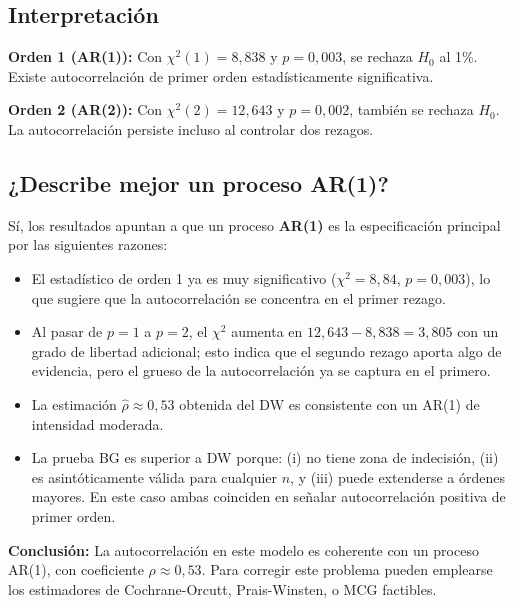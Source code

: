 \documentclass[12pt,a4paper]{article}
\begin{document}
\subsection{Interpretación}

\textbf{Orden 1 (AR(1)):}
Con $\chi^2(1)=8{,}838$ y $p=0{,}003$, se rechaza $H_0$ al 1\%. Existe
autocorrelación de primer orden estadísticamente significativa.

\textbf{Orden 2 (AR(2)):}
Con $\chi^2(2)=12{,}643$ y $p=0{,}002$, también se rechaza $H_0$. La
autocorrelación persiste incluso al controlar dos rezagos.

\subsection{¿Describe mejor un proceso AR(1)?}

Sí, los resultados apuntan a que un proceso \textbf{AR(1)} es la
especificación principal por las siguientes razones:

\begin{itemize}
  \item El estadístico de orden 1 ya es muy significativo ($\chi^2=8{,}84$,
        $p=0{,}003$), lo que sugiere que la autocorrelación se concentra
        en el primer rezago.

  \item Al pasar de $p=1$ a $p=2$, el $\chi^2$ aumenta en $12{,}643-8{,}838=3{,}805$
        con un grado de libertad adicional; esto indica que el segundo rezago
        aporta algo de evidencia, pero el grueso de la autocorrelación ya se
        captura en el primero.

  \item La estimación $\hat\rho \approx 0{,}53$ obtenida del DW es consistente
        con un AR(1) de intensidad moderada.

  \item La prueba BG es superior a DW porque: (i) no tiene zona de
        indecisión, (ii) es asintóticamente válida para cualquier $n$, y
        (iii) puede extenderse a órdenes mayores. En este caso ambas
        coinciden en señalar autocorrelación positiva de primer orden.
\end{itemize}

\textbf{Conclusión:} La autocorrelación en este modelo es coherente con
un proceso AR(1), con coeficiente $\rho \approx 0{,}53$. Para corregir
este problema pueden emplearse los estimadores de Cochrane-Orcutt, Prais-Winsten,
o MCG factibles.
\end{document}
